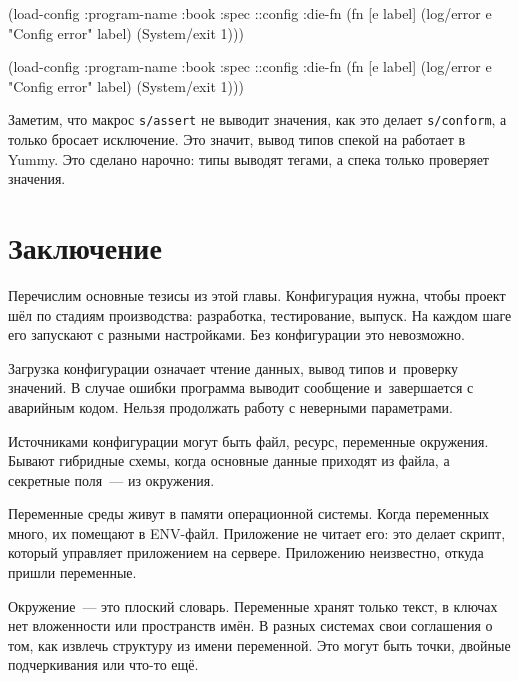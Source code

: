 \begin{english}
  \begin{clojure}
(load-config
 {:program-name :book
  :spec ::config
  :die-fn (fn [e label]
            (log/error e
              "Config error" label)
            (System/exit 1))})
  \end{clojure}
\end{english}

\else

\begin{english}
  \begin{clojure}
(load-config
 {:program-name :book
  :spec ::config
  :die-fn (fn [e label]
            (log/error e "Config error" label)
            (System/exit 1))})
  \end{clojure}
\end{english}

\fi

Заметим, что макрос \verb|s/assert| не выводит значения, как это делает
\verb|s/conform|, а только бросает исключение. Это значит, вывод типов спекой на
работает в Yummy. Это сделано нарочно: типы выводят тегами, а спека только
проверяет значения.

\section{Заключение}

Перечислим основные тезисы из этой главы. Конфигурация нужна, чтобы проект шёл
по стадиям производства: разработка, тестирование, выпуск. На каждом шаге его
запускают с разными настройками. Без конфигурации это невозможно.

Загрузка конфигурации означает чтение данных, вывод типов и~проверку значений. В
случае ошибки программа выводит сообщение и~завершается с аварийным
кодом. Нельзя продолжать работу с неверными параметрами.

Источниками конфигурации могут быть файл, ресурс, переменные окружения. Бывают
гибридные схемы, когда основные данные приходят из файла, а секретные поля~--- из
окружения.

Переменные среды живут в памяти операционной системы. Когда переменных много, их
помещают в ENV-файл. Приложение не читает его: это делает скрипт, который
управляет приложением на сервере. Приложению неизвестно, откуда пришли
переменные.

Окружение~--- это плоский словарь. Переменные хранят только текст, в ключах нет
вложенности или пространств имён. В разных системах свои соглашения о том, как
извлечь структуру из имени переменной. Это могут быть точки, двойные
подчеркивания или что-то ещё.

